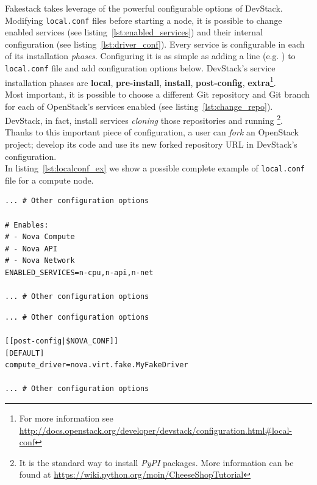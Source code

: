 Fakestack takes leverage of the powerful configurable options of DevStack. Modifying \texttt{local.conf} files before starting a node, it is possible to change enabled services (see listing~\ref{lst:enabled_services}) and their internal configuration (see listing~\ref{lst:driver_conf}). Every service is configurable in each of its installation \textit{phases}. Configuring it is as simple as adding a  line (e.g. ) to \texttt{local.conf} file and add configuration options below. DevStack's service installation phases are \textbf{local}, \textbf{pre-install}, \textbf{install}, \textbf{post-config}, \textbf{extra}\footnote{For more information see \url{http://docs.openstack.org/developer/devstack/configuration.html\#local-conf}}.\\
Most important, it is possible to choose a different Git repository and Git branch for each of OpenStack's services enabled (see listing~\ref{lst:change_repo}). DevStack, in fact, install services \textit{cloning} those repositories and running \footnote{It is the standard way to install \textit{PyPI} packages. More information can be found at \url{https://wiki.python.org/moin/CheeseShopTutorial}}.\\
Thanks to this important piece of configuration, a user can \textit{fork} an OpenStack project; develop its code and use its new forked repository URL in DevStack's configuration.\\
In listing~\ref{lst:localconf_ex} we show a possible complete example of \texttt{local.conf} file for a compute node.

\begin{lstlisting}[floatplacement=H, caption={Choose OpenStack's enabled services}, label={lst:enabled_services}, numbers=none]
... # Other configuration options

# Enables:
# - Nova Compute
# - Nova API
# - Nova Network
ENABLED_SERVICES=n-cpu,n-api,n-net

... # Other configuration options
\end{lstlisting}

\begin{lstlisting}[floatplacement=H, caption={Internal configuration of Nova}, label={lst:driver_conf}, numbers=none]
... # Other configuration options

[[post-config|$NOVA_CONF]]
[DEFAULT]
compute_driver=nova.virt.fake.MyFakeDriver

... # Other configuration options
\end{lstlisting}

